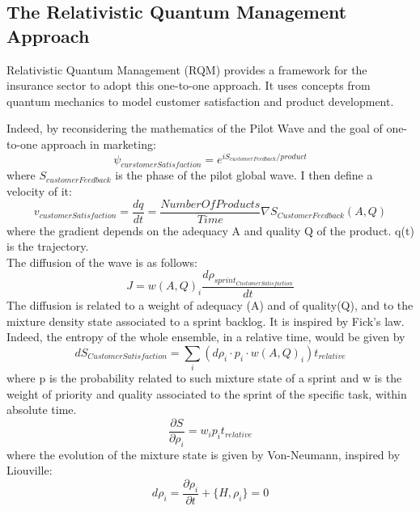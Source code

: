 \documentclass{article}
\begin{document}
\subsection{The Relativistic Quantum Management Approach}
Relativistic Quantum Management (RQM) provides a framework for the insurance sector to adopt this one-to-one approach. It uses concepts from quantum mechanics to model customer satisfaction and product development.

Indeed, by reconsidering the mathematics of the Pilot Wave and the goal of one-to-one approach in marketing:
\begin{equation}
    \psi_{curstomerSatisfaction} = e^{iS_{customerFeedback}/product}
\end{equation}
where $S_{customerFeedback}$ is the phase of the pilot global wave.
I then define a velocity of it:
\begin{equation}
   v_{customerSatisfaction} =  \frac{dq}{dt} =  \frac{NumberOfProducts}{Time} \nabla{S_{CustomerFeedback}(A,Q)}
\end{equation}
where the gradient depends on the adequacy A and quality Q of the product. q(t) is the trajectory.\\
The diffusion of the wave is as follows:
\begin{equation}
    J = w(A, Q)_i \frac{d \rho_{sprint_{CustomerSatisfaction}}}{dt}
\end{equation}
The diffusion is related to a weight of adequacy (A) and of quality(Q), and to the mixture density state associated to a sprint backlog. It is inspired by Fick's law.\\
Indeed, the entropy of the whole ensemble, in a relative time, would be given by
\begin{equation}
    dS_{CustomerSatisfaction} = \sum_i (d\rho_i \cdot p_i \cdot w(A, Q)_i) t_{relative}
\end{equation}
where p is the probability related to such mixture state of a sprint and w is the weight of priority and quality associated to the sprint of the specific task, within absolute time.\\
\begin{equation}
    \frac{\partial S}{\partial \rho_i} = w_i p_i t_{relative}
\end{equation}
where the evolution of the mixture state is given by Von-Neumann, inspired by Liouville:
\begin{equation}
    d\rho_i = \frac{\partial{\rho_i}}{\partial t} + \{H, \rho_i\} =0
\end{equation}
\end{document}
